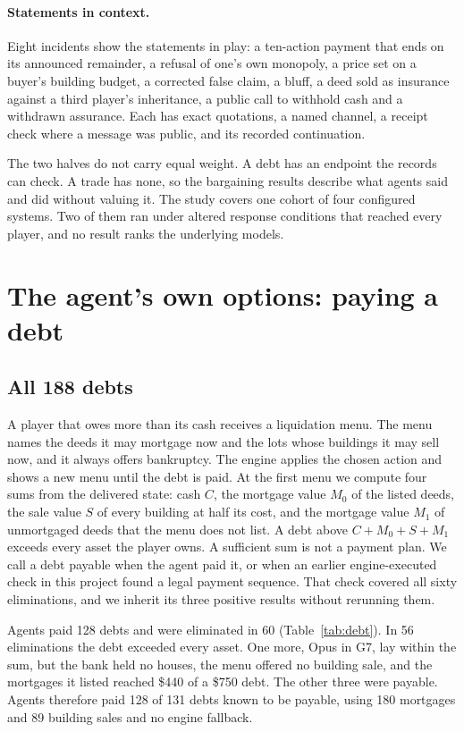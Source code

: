 \documentclass[11pt,letterpaper]{article}
\begin{document}
\paragraph{Statements in context.} Eight incidents show the statements in play: a ten-action payment that ends on its announced remainder, a refusal of one's own monopoly, a price set on a buyer's building budget, a corrected false claim, a bluff, a deed sold as insurance against a third player's inheritance, a public call to withhold cash and a withdrawn assurance. Each has exact quotations, a named channel, a receipt check where a message was public, and its recorded continuation.

The two halves do not carry equal weight. A debt has an endpoint the records can check. A trade has none, so the bargaining results describe what agents said and did without valuing it. The study covers one cohort of four configured systems. Two of them ran under altered response conditions that reached every player, and no result ranks the underlying models.

\section{The agent's own options: paying a debt}
\label{sec:own}

\subsection{All 188 debts}

A player that owes more than its cash receives a liquidation menu. The menu names the deeds it may mortgage now and the lots whose buildings it may sell now, and it always offers bankruptcy. The engine applies the chosen action and shows a new menu until the debt is paid. At the first menu we compute four sums from the delivered state: cash $C$, the mortgage value $M_0$ of the listed deeds, the sale value $S$ of every building at half its cost, and the mortgage value $M_1$ of unmortgaged deeds that the menu does not list. A debt above $C+M_0+S+M_1$ exceeds every asset the player owns. A sufficient sum is not a payment plan. We call a debt payable when the agent paid it, or when an earlier engine-executed check in this project found a legal payment sequence. That check covered all sixty eliminations, and we inherit its three positive results without rerunning them.

Agents paid 128 debts and were eliminated in 60 (Table~\ref{tab:debt}). In 56 eliminations the debt exceeded every asset. One more, Opus in G7, lay within the sum, but the bank held no houses, the menu offered no building sale, and the mortgages it listed reached \$440 of a \$750 debt. The other three were payable. Agents therefore paid 128 of 131 debts known to be payable, using 180 mortgages and 89 building sales and no engine fallback.
\end{document}
